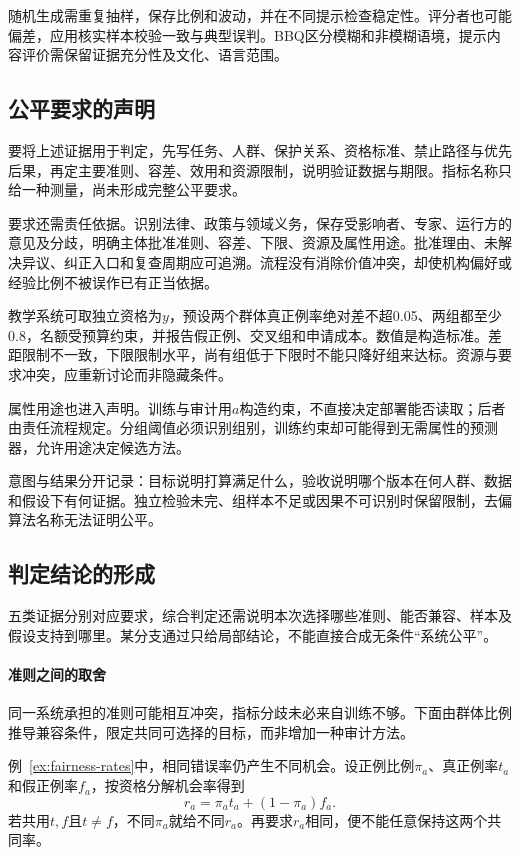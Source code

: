 随机生成需重复抽样，保存比例和波动，并在不同提示检查稳定性。评分者也可能偏差，应用核实样本校验一致与典型误判。BBQ区分模糊和非模糊语境，提示内容评价需保留证据充分性及文化、语言范围。

\subsection{公平要求的声明}
\label{sec:fairness-requirements}

要将上述证据用于判定，先写任务、人群、保护关系、资格标准、禁止路径与优先后果，再定主要准则、容差、效用和资源限制，说明验证数据与期限。指标名称只给一种测量，尚未形成完整公平要求。

要求还需责任依据。识别法律、政策与领域义务，保存受影响者、专家、运行方的意见及分歧，明确主体批准准则、容差、下限、资源及属性用途。批准理由、未解决异议、纠正入口和复查周期应可追溯。流程没有消除价值冲突，却使机构偏好或经验比例不被误作已有正当依据。

教学系统可取独立资格为$y$，预设两个群体真正例率绝对差不超0.05、两组都至少0.8，名额受预算约束，并报告假正例、交叉组和申请成本。数值是构造标准。差距限制不一致，下限限制水平，尚有组低于下限时不能只降好组来达标。资源与要求冲突，应重新讨论而非隐藏条件。

属性用途也进入声明。训练与审计用$a$构造约束，不直接决定部署能否读取；后者由责任流程规定。分组阈值必须识别组别，训练约束却可能得到无需属性的预测器，允许用途决定候选方法。

意图与结果分开记录：目标说明打算满足什么，验收说明哪个版本在何人群、数据和假设下有何证据。独立检验未完、组样本不足或因果不可识别时保留限制，去偏算法名称无法证明公平。

\subsection{判定结论的形成}
\label{sec:fairness-compatibility}

五类证据分别对应要求，综合判定还需说明本次选择哪些准则、能否兼容、样本及假设支持到哪里。某分支通过只给局部结论，不能直接合成无条件“系统公平”。

\paragraph{准则之间的取舍}

同一系统承担的准则可能相互冲突，指标分歧未必来自训练不够。下面由群体比例推导兼容条件，限定共同可选择的目标，而非增加一种审计方法。

例~\ref{ex:fairness-rates}中，相同错误率仍产生不同机会。设正例比例$\pi_a$、真正例率$t_a$和假正例率$f_a$，按资格分解机会率得到
\[
 r_a=\pi_a t_a+(1-\pi_a)f_a.
\]
若共用$t,f$且$t\ne f$，不同$\pi_a$就给不同$r_a$。再要求$r_a$相同，便不能任意保持这两个共同率。

